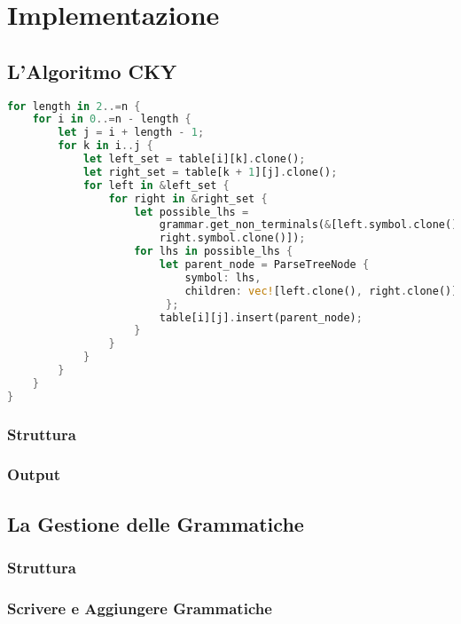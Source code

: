 \chapter{Implementazione}

\section{L'Algoritmo CKY}

\begin{lstlisting}[language=rust, caption = Algoritmo CKY]
for length in 2..=n {
    for i in 0..=n - length {
        let j = i + length - 1;
        for k in i..j {
            let left_set = table[i][k].clone();
            let right_set = table[k + 1][j].clone();
            for left in &left_set {
                for right in &right_set {
                    let possible_lhs =
                        grammar.get_non_terminals(&[left.symbol.clone(), 
                        right.symbol.clone()]);
                    for lhs in possible_lhs {
                        let parent_node = ParseTreeNode {
                            symbol: lhs,
                            children: vec![left.clone(), right.clone()],
                         };
                        table[i][j].insert(parent_node);
                    }
                }
            }
        }
    }
}


\end{lstlisting}

\subsection{Struttura}

\subsection{Output}

\section{La Gestione delle Grammatiche}

\subsection{Struttura}

\subsection{Scrivere e Aggiungere Grammatiche}
